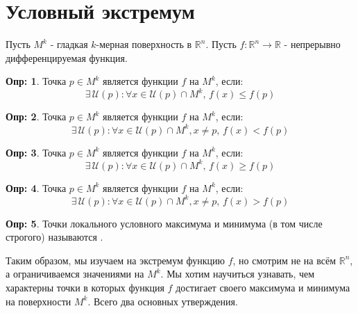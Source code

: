 \documentclass[12pt]{article}
\newcommand{\RN}[1]{%
	\textup{\uppercase\expandafter{\romannumeral#1}}%
}
\newcommand{\MR}{\mathbb{R}}
\newcommand{\MU}{\mathcal{U}}
\theoremstyle{definition}
\newtheorem{defn}{Опр:}
\begin{document}
\lhead{Математический анализ - \RN{2}}
\section*{Условный экстремум}
Пусть $M^k$ - гладкая $k$-мерная поверхность в $\MR^n$. Пусть $f \colon \MR^n \to \MR$ - непрерывно дифференцируемая функция. 
\begin{defn}
	Точка $p \in M^k$ является  функции $f$ на $M^k$, если: 
	$$
		\exists \, \MU(p) \colon \forall x \in \MU(p) \cap M^k, \, f(x) \leq f(p)
	$$
\end{defn}
\begin{defn}
	Точка $p \in M^k$ является  функции $f$ на $M^k$, если: 
	$$
		\exists \, \MU(p) \colon \forall x \in \MU(p) \cap M^k, x \neq p, \, f(x) < f(p)
	$$
\end{defn}
\begin{defn}
	Точка $p \in M^k$ является  функции $f$ на $M^k$, если: 
	$$
		\exists \, \MU(p) \colon \forall x \in \MU(p) \cap M^k, \, f(x) \geq f(p)
	$$
\end{defn}
\begin{defn}
	Точка $p \in M^k$ является  функции $f$ на $M^k$, если: 
	$$
		\exists \, \MU(p) \colon \forall x \in \MU(p) \cap M^k, x \neq p, \, f(x) > f(p)
	$$
\end{defn}
\begin{defn}
	Точки локального условного максимума и минимума (в том числе строгого) называются .
\end{defn}
Таким образом, мы изучаем на экстремум функцию $f$, но смотрим не на всём $\MR^n$, а ограничиваемся значениями на $M^k$. Мы хотим научиться узнавать, чем характерны точки в которых функция $f$ достигает своего максимума и минимума на поверхности $M^k$. Всего два основных утверждения.
\end{document}
